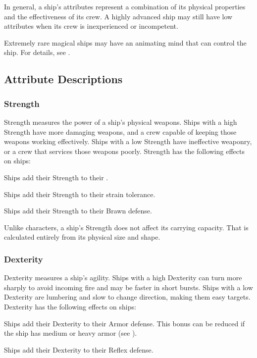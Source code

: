   In general, a ship's attributes represent a combination of its physical properties and the effectiveness of its crew.
  A highly advanced ship may still have low attributes when its crew is inexperienced or incompetent.

  Extremely rare magical ships may have an animating mind that can control the ship.
  For details, see .

  \subsection{Attribute Descriptions}

    \subsubsection{Strength}
      Strength measures the power of a ship's physical weapons.
      Ships with a high Strength have more damaging weapons, and a crew capable of keeping those weapons working effectively.
      Ships with a low Strength have ineffective weaponry, or a crew that services those weapons poorly.
      Strength has the following effects on ships:
      \begin{raggeditemize}
        \item Ships add their Strength to their .
        \item Ships add their Strength to their strain tolerance.
        \item Ships add their Strength to their Brawn defense.
      \end{raggeditemize}

      Unlike characters, a ship's Strength does not affect its carrying capacity.
      That is calculated entirely from its physical size and shape.

    \subsubsection{Dexterity}
      Dexterity measures a ship's agility.
      Ships with a high Dexterity can turn more sharply to avoid incoming fire and may be faster in short bursts.
      Ships with a low Dexterity are lumbering and slow to change direction, making them easy targets.
      Dexterity has the following effects on ships:
      \begin{raggeditemize}
        \item Ships add their Dexterity to their Armor defense.
          This bonus can be reduced if the ship has medium or heavy armor (see ).
        \item Ships add their Dexterity to their Reflex defense.
      \end{raggeditemize}

